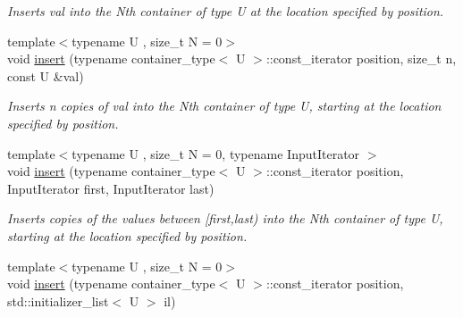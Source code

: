 \begin{DoxyCompactItemize}
\begin{DoxyCompactList}\small\item\em Inserts val into the Nth container of type U at the location specified by position. \end{DoxyCompactList}\item 
\hypertarget{classheterogeneous_1_1heterodeque_3_01_t_00_01_types_8_8_8_4_a3c60cb1f06d74f2baf34644d9d661b91}{}{\footnotesize template$<$typename U , size\+\_\+t N = 0$>$ }\\void \hyperlink{classheterogeneous_1_1heterodeque_3_01_t_00_01_types_8_8_8_4_a3c60cb1f06d74f2baf34644d9d661b91}{insert} (typename container\+\_\+type$<$ U $>$\+::const\+\_\+iterator position, size\+\_\+t n, const U \&val)\label{classheterogeneous_1_1heterodeque_3_01_t_00_01_types_8_8_8_4_a3c60cb1f06d74f2baf34644d9d661b91}

\begin{DoxyCompactList}\small\item\em Inserts n copies of val into the Nth container of type U, starting at the location specified by position. \end{DoxyCompactList}\item 
\hypertarget{classheterogeneous_1_1heterodeque_3_01_t_00_01_types_8_8_8_4_a192e7666d7c35ce643d6c9c89acd32fb}{}{\footnotesize template$<$typename U , size\+\_\+t N = 0, typename Input\+Iterator $>$ }\\void \hyperlink{classheterogeneous_1_1heterodeque_3_01_t_00_01_types_8_8_8_4_a192e7666d7c35ce643d6c9c89acd32fb}{insert} (typename container\+\_\+type$<$ U $>$\+::const\+\_\+iterator position, Input\+Iterator first, Input\+Iterator last)\label{classheterogeneous_1_1heterodeque_3_01_t_00_01_types_8_8_8_4_a192e7666d7c35ce643d6c9c89acd32fb}

\begin{DoxyCompactList}\small\item\em Inserts copies of the values between \mbox{[}first,last) into the Nth container of type U, starting at the location specified by position. \end{DoxyCompactList}\item 
\hypertarget{classheterogeneous_1_1heterodeque_3_01_t_00_01_types_8_8_8_4_ad5d273b51219a7abfb9ac3d2ce7d399b}{}{\footnotesize template$<$typename U , size\+\_\+t N = 0$>$ }\\void \hyperlink{classheterogeneous_1_1heterodeque_3_01_t_00_01_types_8_8_8_4_ad5d273b51219a7abfb9ac3d2ce7d399b}{insert} (typename container\+\_\+type$<$ U $>$\+::const\+\_\+iterator position, std\+::initializer\+\_\+list$<$ U $>$ il)\label{classheterogeneous_1_1heterodeque_3_01_t_00_01_types_8_8_8_4_ad5d273b51219a7abfb9ac3d2ce7d399b}


\end{DoxyCompactItemize}
